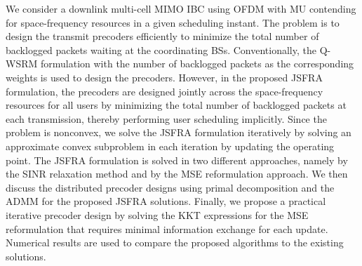 We consider a downlink multi-cell \ac{MIMO} \ac{IBC} using \ac{OFDM} with \acl{MU} contending for space-frequency resources in a given scheduling instant. The problem is to design the transmit precoders efficiently to minimize the total number of backlogged packets waiting at the coordinating \acp{BS}. Conventionally, the \ac{Q-WSRM} formulation with the number of backlogged packets as the corresponding weights is used to design the precoders. However, in the proposed \ac{JSFRA} formulation, the precoders are designed jointly across the space-frequency resources for all users by minimizing the total number of backlogged packets at each transmission, thereby performing user scheduling implicitly. Since the problem is nonconvex, we solve the \ac{JSFRA} formulation iteratively by solving an approximate convex subproblem in each iteration by updating the operating point. The \ac{JSFRA} formulation is solved in two different approaches, namely by the \ac{SINR} relaxation method and by the \ac{MSE} reformulation approach. We then discuss the distributed precoder designs using primal decomposition and the \ac{ADMM} for the proposed \ac{JSFRA} solutions. Finally, we propose a practical iterative precoder design by solving the \acl{KKT} expressions for the \ac{MSE} reformulation that requires minimal information exchange for each update. Numerical results are used to compare the proposed algorithms to the existing solutions.